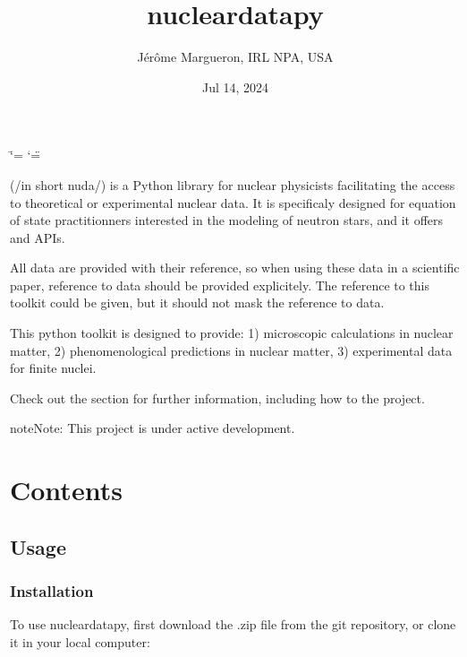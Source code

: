 \documentclass[letterpaper,10pt,english]{sphinxmanual}
\title{nucleardatapy}
\date{Jul 14, 2024}
\author{Jérôme Margueron, IRL NPA, USA}
\begin{document}
\ifdefined\shorthandoff
  \ifnum\catcode`\=\string=\active\shorthandoff{=}\fi
  \ifnum\catcode`\"=\active{}\fi
\fi

\pagestyle{empty}
\sphinxmaketitle
\pagestyle{plain}
\sphinxtableofcontents
\pagestyle{normal}
\label{\detokenize{index::doc}}


\sphinxAtStartPar
{} (/in short nuda/) is a Python library for nuclear physicists facilitating the access to theoretical or experimental nuclear data. It is specificaly designed for equation of state practitionners interested in the modeling of neutron stars, and it offers  and  APIs.

\sphinxAtStartPar
All data are provided with their reference, so when using these data in a scientific paper, reference to data should be provided explicitely. The reference to this toolkit could be given, but it should not mask the reference to data.

\sphinxAtStartPar
This python toolkit is designed to provide:
1) microscopic calculations in nuclear matter,
2) phenomenological predictions in nuclear matter,
3) experimental data for finite nuclei.

\sphinxAtStartPar
Check out the {\hyperref[\detokenize{source/usage::doc}]{}} section for further information, including how to
{\hyperref[\detokenize{source/usage:installation}]{}} the project.

\begin{sphinxadmonition}{note}{Note:}
\sphinxAtStartPar
This project is under active development.
\end{sphinxadmonition}


\chapter{Contents}
\label{\detokenize{index:contents}}
\sphinxstepscope


\section{Usage}
\label{\detokenize{source/usage:usage}}\label{\detokenize{source/usage::doc}}

\subsection{Installation}
\label{\detokenize{source/usage:installation}}\label{\detokenize{source/usage:id1}}
\sphinxAtStartPar
To use nucleardatapy, first download the .zip file from the git repository, or clone it in your local computer:
\end{document}

